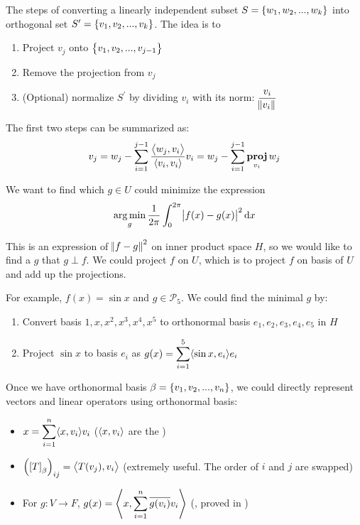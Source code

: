 \begin{theorem}\label{gram_schmidt_process}
    The steps of converting a linearly independent subset $S=\set{w_1, w_2, ..., w_k}$ into orthogonal set $S^\prime=\set{v_1, v_2, ..., v_k}$. The idea is to 
    \begin{enumerate}
        \item Project $v_{j}$ onto $\set{v_1, v_2, ..., v_{j-1}}$
        \item Remove the projection from $v_j$
        \item (Optional) normalize $S^\prime$ by dividing $v_i$ with its norm: $\displaystyle \frac{v_i}{\norm{v_i}}$
    \end{enumerate}
    
    The first two steps can be summarized as:
    \begin{equation}
        v_j = w_j - \sum_{i=1}^{j-1} \frac{\innerproduct{w_j}{v_i}}{\innerproduct{v_i}{v_i}} v_i = w_j - \sum_{i=1}^{j-1} \projection{w_j}{v_i}
    \end{equation}
\end{theorem}


\begin{example}
    We want to find which $g \in U$ could minimize the expression
    \begin{equation}
        \argmin{g} \frac{1}{2\pi}\int_{0}^{2\pi} \absolutevalue{f(x) - g(x)}^2 \dif x
    \end{equation}
    
     This is an expression of $\norm{f - g}^2$ on inner product space $H$, so we would like to find a $g$ that $g \perp f$. We could project $f$ on $U$, which is to project $f$ on basis of $U$ and add up the projections.
     
     For example, $f(x) = \sin{x}$ and $g \in \mathcal{P}_5$. We could find the minimal $g$ by:
     \begin{enumerate}
         \item Convert basis $1, x, x^2, x^3, x^4, x^5$ to orthonormal basis $e_1, e_2, e_3, e_4, e_5$ in $H$
         \item Project $\sin{x}$ to basis $e_i$ as $\displaystyle g(x) = \sum_{i=1}^5 \innerproduct{\sin{x}}{e_i}e_i$
     \end{enumerate}
\end{example}

Once we have orthonormal basis $\beta = \set{v_1, v_2, ..., v_n}$,  we could directly represent vectors and linear operators using orthonormal basis:
\begin{itemize}
    \item $\displaystyle x = \sum_{i=1}^n \innerproduct{x}{v_i} v_i$ ($\innerproduct{x}{v_i}$ are the )
    \item $\mleft(\coordinate{T}_\beta\mright)_{ij} = \innerproduct{T(v_j)}{v_i}$ (extremely useful. The order of $i$ and $j$ are swapped)
    \item For $g: V \rightarrow F$, $g(x) = \innerproduct{x}{\sum_{i=1}^n \conjugate{g(v_i)} v_i}$ (, proved in )
\end{itemize}


